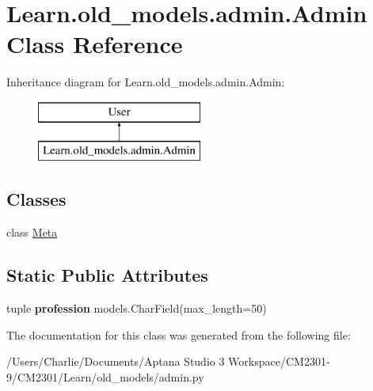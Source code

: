 \hypertarget{class_learn_1_1old__models_1_1admin_1_1_admin}{\section{Learn.\-old\-\_\-models.\-admin.\-Admin Class Reference}
\label{class_learn_1_1old__models_1_1admin_1_1_admin}
}
Inheritance diagram for Learn.\-old\-\_\-models.\-admin.\-Admin\-:\begin{figure}[H]
\begin{center}
\leavevmode
\includegraphics[height=2.000000cm]{class_learn_1_1old__models_1_1admin_1_1_admin}
\end{center}
\end{figure}
\subsection*{Classes}
\begin{DoxyCompactItemize}
\item 
class \hyperlink{class_learn_1_1old__models_1_1admin_1_1_admin_1_1_meta}{Meta}
\end{DoxyCompactItemize}
\subsection*{Static Public Attributes}
\begin{DoxyCompactItemize}
\item 
\hypertarget{class_learn_1_1old__models_1_1admin_1_1_admin_ad42fa652657a6cfb6a23167381e304fa}{tuple {\bfseries profession} models.\-Char\-Field(max\-\_\-length=50)}\label{class_learn_1_1old__models_1_1admin_1_1_admin_ad42fa652657a6cfb6a23167381e304fa}

\end{DoxyCompactItemize}


The documentation for this class was generated from the following file\-:\begin{DoxyCompactItemize}
\item 
/\-Users/\-Charlie/\-Documents/\-Aptana Studio 3 Workspace/\-C\-M2301-\/9/\-C\-M2301/\-Learn/old\-\_\-models/admin.\-py\end{DoxyCompactItemize}
